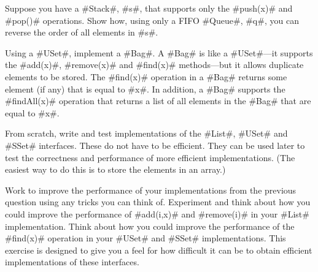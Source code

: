 \begin{exc}
  Suppose you have a #Stack#, #s#, that supports only the #push(x)# and #pop()# operations. Show how, using only a FIFO #Queue#, #q#, you can reverse the order of all elements in #s#.
\end{exc}

\begin{exc}
  Using a #USet#, implement a #Bag#.  A #Bag# is like a #USet#---it supports the #add(x)#, #remove(x)# and #find(x)# methods---but it allows duplicate elements to be stored.  The #find(x)# operation in a #Bag# returns some element (if any) that is equal to #x#.  In addition, a #Bag# supports the #findAll(x)# operation that returns a list of all elements in the #Bag# that are equal to #x#.
\end{exc}

\begin{exc}
  From scratch, write and test implementations of the #List#, #USet# and #SSet# interfaces.  These do not have to be efficient.  They can be used later to test the correctness and performance of more efficient implementations.  (The easiest way to do this is to store the elements in an array.)
\end{exc}

\begin{exc}
  Work to improve the performance of your implementations from the previous question using any tricks you can think of.  Experiment and think about how you could improve the performance of #add(i,x)# and #remove(i)# in your #List# implementation.  Think about how you could improve the performance of the #find(x)# operation in your #USet# and #SSet# implementations.  This exercise is designed to give you a feel for  how difficult it can be to obtain efficient implementations of these interfaces.
\end{exc}




